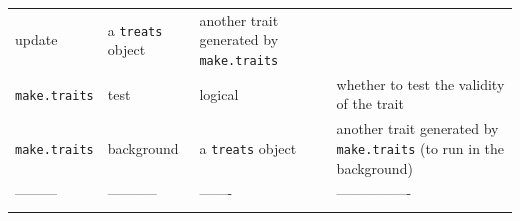 \documentclass[
]{book}
\begin{document}
\begin{longtable}[]{@{}llll@{}}
\begin{minipage}[t]{0.23\columnwidth}
update\strut
\end{minipage} & \begin{minipage}[t]{0.14\columnwidth}\raggedright
a \texttt{treats} object\strut
\end{minipage} & \begin{minipage}[t]{0.33\columnwidth}\raggedright
another trait generated by \texttt{make.traits}\strut
\end{minipage}\tabularnewline
\begin{minipage}[t]{0.19\columnwidth}\raggedright
\texttt{make.traits}\strut
\end{minipage} & \begin{minipage}[t]{0.23\columnwidth}\raggedright
test\strut
\end{minipage} & \begin{minipage}[t]{0.14\columnwidth}\raggedright
logical\strut
\end{minipage} & \begin{minipage}[t]{0.33\columnwidth}\raggedright
whether to test the validity of the trait\strut
\end{minipage}\tabularnewline
\begin{minipage}[t]{0.19\columnwidth}\raggedright
\texttt{make.traits}\strut
\end{minipage} & \begin{minipage}[t]{0.23\columnwidth}\raggedright
background\strut
\end{minipage} & \begin{minipage}[t]{0.14\columnwidth}\raggedright
a \texttt{treats} object\strut
\end{minipage} & \begin{minipage}[t]{0.33\columnwidth}\raggedright
another trait generated by \texttt{make.traits} (to run in the background)\strut
\end{minipage}\tabularnewline
\begin{minipage}[t]{0.19\columnwidth}\raggedright
---------\strut
\end{minipage} & \begin{minipage}[t]{0.23\columnwidth}\raggedright
-----------\strut
\end{minipage} & \begin{minipage}[t]{0.14\columnwidth}\raggedright
-------\strut
\end{minipage} & \begin{minipage}[t]{0.33\columnwidth}\raggedright
----------------\strut
\end{minipage}\tabularnewline
\begin{minipage}[t]{0.19\columnwidth}\raggedright

\end{minipage}
\end{longtable}
\end{document}
